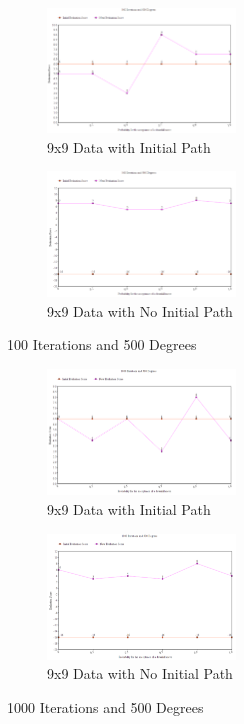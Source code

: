 \documentclass[11pt, oneside]{article}   	%
\begin{document}
\begin{figure}[H]
\centering
\begin{subfigure}{.5\textwidth}
	\centering
	\includegraphics[width=50mm]{9x9lowIhighT.png}
	\caption{9x9 Data with Initial Path}
	\label{fig:method}
\end{subfigure}%
\begin{subfigure}{.5\textwidth}
	\centering
	\includegraphics[width=50mm]{9x9lowIhighTPath.png}
	\caption{9x9 Data with No Initial Path}
	\label{fig:method}
\end{subfigure}
\caption{100 Iterations and 500 Degrees}
\end{figure}

\begin{figure}[H]
\centering
\begin{subfigure}{.5\textwidth}
	\centering
	\includegraphics[width=50mm]{9x9highIhighT.png}
	\caption{9x9 Data with Initial Path}
	\label{fig:method}
\end{subfigure}%
\begin{subfigure}{.5\textwidth}
	\centering
	\includegraphics[width=50mm]{9x9highIhighTPath.png}
	\caption{9x9 Data with No Initial Path}
	\label{fig:method}
\end{subfigure}
\caption{1000 Iterations and 500 Degrees}
\end{figure}
\end{document}
